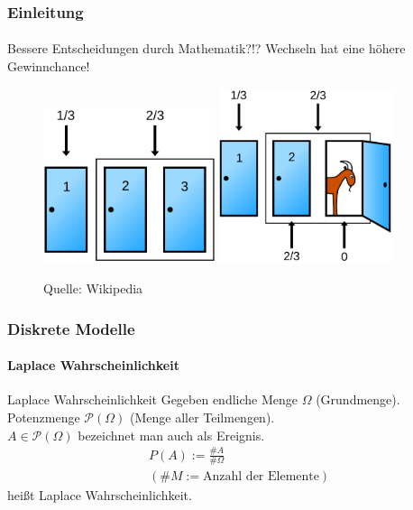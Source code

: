 \documentclass{beamer}
\begin{document}
\begin{frame}
    \frametitle{Einleitung}
\framesubtitle{}

\begin{block}{Bessere Entscheidungen durch Mathematik?!?}
Wechseln hat eine höhere Gewinnchance!
\end{block}

\begin{figure}[htp]
      \centering
    \includegraphics[width=0.45\textwidth]{img/Monty_closed_1}
    \includegraphics[width=0.45\textwidth]{img/Monty_open_1}
      \caption{Quelle: Wikipedia}
\end{figure}

 \end{frame}


\begin{frame}
    \frametitle{Diskrete Modelle}
\framesubtitle{ Laplace Wahrscheinlichkeit}

\begin{block}{Laplace Wahrscheinlichkeit}
Gegeben endliche Menge $\Omega$ (Grundmenge). \\
Potenzmenge  $\mathcal{P}(\Omega)$   (Menge aller Teilmengen).  \\
$A \in \mathcal{P}(\Omega)$ bezeichnet man auch als Ereignis. 
\begin{align*}
& P(A) := \frac{ \#A}{ \# \Omega} \\
 & (\#M := \text{Anzahl der Elemente})
\end{align*}
heißt Laplace Wahrscheinlichkeit.
\end{block}
 \end{frame}
\end{document}
